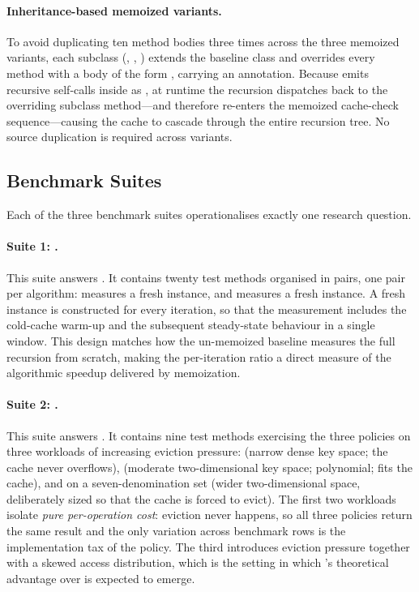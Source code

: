 \paragraph{Inheritance-based memoized variants.} To avoid duplicating ten method bodies three times across the three memoized variants, each subclass (, , ) extends the baseline  class and overrides every method with a body of the form , carrying an  annotation. Because  emits recursive self-calls inside  as , at runtime the recursion dispatches back to the overriding subclass method---and therefore re-enters the memoized cache-check sequence---causing the cache to cascade through the entire recursion tree. No source duplication is required across variants.

\subsection{Benchmark Suites}\label{sec:suites}

Each of the three benchmark suites operationalises exactly one research question.

\paragraph{Suite 1: .} This suite answers . It contains twenty test methods organised in pairs, one pair per algorithm:  measures a fresh  instance, and  measures a fresh  instance. A fresh instance is constructed for every  iteration, so that the measurement includes the cold-cache warm-up and the subsequent steady-state behaviour in a single window. This design matches how the un-memoized baseline measures the full recursion from scratch, making the per-iteration ratio a direct measure of the algorithmic speedup delivered by memoization.

\paragraph{Suite 2: .} This suite answers . It contains nine test methods exercising the three policies on three workloads of increasing eviction pressure:  (narrow dense key space; the cache never overflows),  (moderate two-dimensional key space; polynomial; fits the cache), and  on a seven-denomination set (wider two-dimensional space, deliberately sized so that the cache is forced to evict). The first two workloads isolate \emph{pure per-operation cost}: eviction never happens, so all three policies return the same result and the only variation across benchmark rows is the implementation tax of the policy. The third introduces eviction pressure together with a skewed access distribution, which is the setting in which \lfu's theoretical advantage over \lru is expected to emerge.

